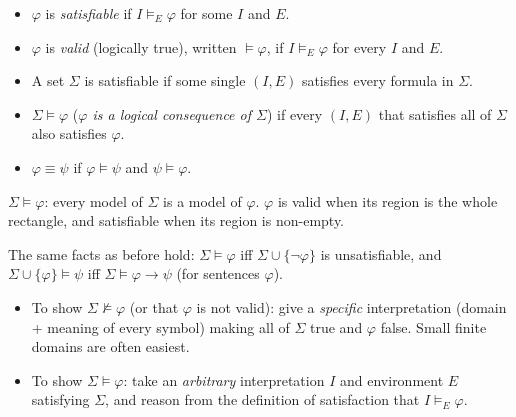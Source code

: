 \begin{definition}
\begin{itemize}
  \item $\varphi$ is \emph{satisfiable} if $I\models_E\varphi$ for some $I$ and $E$.
  \item $\varphi$ is \emph{valid} (logically true), written $\models\varphi$, if
        $I\models_E\varphi$ for every $I$ and $E$.
  \item A set $\Sigma$ is satisfiable if some single $(I,E)$ satisfies every formula
        in $\Sigma$.
  \item $\Sigma\models\varphi$ (\emph{$\varphi$ is a logical consequence of $\Sigma$}) if
        every $(I,E)$ that satisfies all of $\Sigma$ also satisfies $\varphi$.
  \item $\varphi\equiv\psi$ if $\varphi\models\psi$ and $\psi\models\varphi$.
\end{itemize}
\end{definition}

\begin{center}

\small $\Sigma\models\varphi$: every model of $\Sigma$ is a model of $\varphi$. $\varphi$ is valid when its
region is the whole rectangle, and satisfiable when its region is non-empty.
\end{center}

The same facts as before hold: $\Sigma\models\varphi$ iff $\Sigma\cup\{\neg\varphi\}$ is
unsatisfiable, and $\Sigma\cup\{\varphi\}\models\psi$ iff $\Sigma\models\varphi\to\psi$
(for sentences $\varphi$).

\begin{important}
\begin{itemize}
  \item To show $\Sigma\not\models\varphi$ (or that $\varphi$ is not valid): give a
        \emph{specific} interpretation (domain + meaning of every symbol) making all of
        $\Sigma$ true and $\varphi$ false. Small finite domains are often easiest.
  \item To show $\Sigma\models\varphi$: take an \emph{arbitrary} interpretation $I$ and
        environment $E$ satisfying $\Sigma$, and reason from the definition of
        satisfaction that $I\models_E\varphi$.
\end{itemize}
\end{important}

